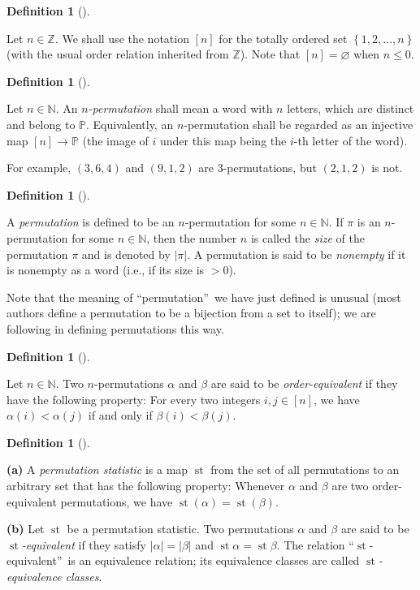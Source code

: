 \documentclass[numbers=enddot,12pt,final,onecolumn,notitlepage]{scrartcl}%
\theoremstyle{definition}
\newtheorem{defi}[theo]{Definition}
\newenvironment{definition}[1][]
{\begin{defi}[#1]\begin{leftbar}}
{\end{leftbar}\end{defi}}
\begin{document}
\begin{definition}
Let $n\in\mathbb{Z}$. We shall use the notation $\left[  n\right]  $ for the
totally ordered set $\left\{  1,2,\ldots,n\right\}  $ (with the usual order
relation inherited from $\mathbb{Z}$). Note that $\left[  n\right]
=\varnothing$ when $n\leq0$.
\end{definition}

\begin{definition}
\label{def.perm}Let $n\in\mathbb{N}$. An $n$\textit{-permutation} shall mean a
word with $n$ letters, which are distinct and belong to $\mathbb{P}$.
Equivalently, an $n$-permutation shall be regarded as an injective map
$\left[  n\right]  \rightarrow\mathbb{P}$ (the image of $i$ under this map
being the $i$-th letter of the word).
\end{definition}

For example, $\left(  3,6,4\right)  $ and $\left(  9,1,2\right)  $ are
$3$-permutations, but $\left(  2,1,2\right)  $ is not.

\begin{definition}
A \textit{permutation} is defined to be an $n$-permutation for some
$n\in\mathbb{N}$. If $\pi$ is an $n$-permutation for some $n\in\mathbb{N}$,
then the number $n$ is called the \textit{size} of the
permutation $\pi$ and is denoted by $\left\vert \pi\right\vert $. A
permutation is said to be \textit{nonempty} if it is nonempty as a word (i.e.,
if its size is $>0$).
\end{definition}

Note that the meaning of \textquotedblleft permutation\textquotedblright\ we
have just defined is unusual (most authors define a permutation to be a
bijection from a set to itself); we are following \cite{part1} in defining
permutations this way.

\begin{definition}
Let $n\in\mathbb{N}$. Two $n$-permutations $\alpha$ and $\beta$ are said to be
\textit{order-equivalent} if they have the following property: For every two
integers $i,j\in\left[  n\right]  $, we have $\alpha\left(  i\right)
<\alpha\left(  j\right)  $ if and only if $\beta\left(  i\right)
<\beta\left(  j\right)  $.
\end{definition}

\begin{definition}
\textbf{(a)} A \textit{permutation statistic} is a map $\operatorname*{st}$
from the set of all permutations to an arbitrary set that has the following
property: Whenever $\alpha$ and $\beta$ are two order-equivalent permutations,
we have $\operatorname*{st}\left(  \alpha\right)  =\operatorname*{st}\left(
\beta\right)  $.

\textbf{(b)} Let $\operatorname*{st}$ be a permutation statistic. Two
permutations $\alpha$ and $\beta$ are said to be $\operatorname*{st}%
$\textit{-equivalent} if they satisfy $\left\vert \alpha\right\vert
=\left\vert \beta\right\vert $ and $\operatorname*{st}\alpha
=\operatorname*{st}\beta$. The relation \textquotedblleft$\operatorname*{st}%
$-equivalent\textquotedblright\ is an equivalence relation; its equivalence
classes are called $\operatorname*{st}$\textit{-equivalence classes}.
\end{definition}
\end{document}
